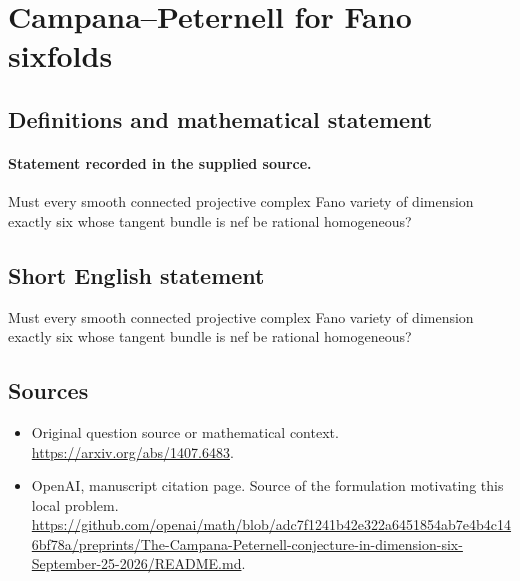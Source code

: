 \documentclass[11pt]{article}
\begin{document}
\section*{Campana–Peternell for Fano sixfolds}\label{30007017}
\subsection{Definitions and mathematical statement}
\paragraph{Statement recorded in the supplied source.}
Must every smooth connected projective complex Fano variety of dimension exactly six whose tangent bundle is nef be rational homogeneous?
\subsection{Short English statement}
Must every smooth connected projective complex Fano variety of dimension exactly six whose tangent bundle is nef be rational homogeneous?
\subsection{Sources}
\begin{itemize}
\item[S1] Original question source or mathematical context.
\url{https://arxiv.org/abs/1407.6483}.
\item[S2] OpenAI, manuscript citation page. Source of the formulation motivating this local problem.
\url{https://github.com/openai/math/blob/adc7f1241b42e322a6451854ab7e4b4c146bf78a/preprints/The-Campana-Peternell-conjecture-in-dimension-six-September-25-2026/README.md}.
\end{itemize}
\end{document}

